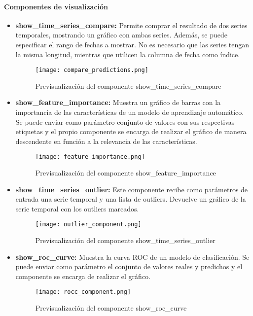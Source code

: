\paragraph{Componentes de visualización}
\begin{itemize}
    \item \textbf{show\_time\_series\_compare:} Permite comprar el resultado de dos series temporales,
    mostrando un gráfico con ambas series. Además, se puede especificar el rango de fechas a mostrar.
    No es necesario que las series tengan la misma longitud, mientras que utilicen la columna de fecha
    como índice.
    \begin{figure}[!h]
        \centering
        \texttt{[image: compare\_predictions.png]}
        \caption{Previsualización del componente show\_time\_series\_compare}
        \label{fig:compare_predictions}
    \end{figure}
    \item \textbf{show\_feature\_importance:} Muestra un gráfico de barras con la importancia de las
    características de un modelo de aprendizaje automático. Se puede enviar como parámetro conjunto 
    de valores con sus respectivas etiquetas y el propio componente se encarga de realizar el gráfico
    de manera descendente en función a la relevancia de las características.
    \begin{figure}[!h]
        \centering
        \texttt{[image: feature\_importance.png]}
        \caption{Previsualización del componente show\_feature\_importance}
        \label{fig:feature_importance}
    \end{figure}
    \item \textbf{show\_time\_series\_outlier:} Este componente recibe como parámetros de entrada
    una serie temporal y una lista de outliers. Devuelve un gráfico de la serie temporal con los
    outliers marcados. 
    \begin{figure}[!h]
        \centering
        \texttt{[image: outlier\_component.png]}
        \caption{Previsualización del componente show\_time\_series\_outlier}
        \label{fig:outlier_component}
    \end{figure}
    \item \textbf{show\_roc\_curve:} Muestra la curva ROC de un modelo de clasificación. Se puede
    enviar como parámetro el conjunto de valores reales y predichos y el componente se encarga de
    realizar el gráfico.
    \begin{figure}[!h]
        \centering
        \texttt{[image: rocc\_component.png]}
        \caption{Previsualización del componente show\_roc\_curve}
        \label{fig:roc_curve}
    \end{figure}
\end{itemize}

